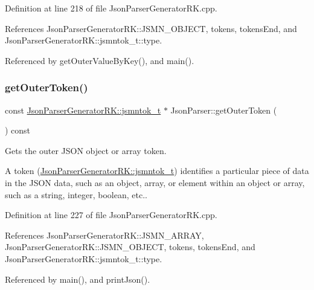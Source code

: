 Definition at line 218 of file Json\+Parser\+Generator\+R\+K.\+cpp.



References Json\+Parser\+Generator\+R\+K\+::\+J\+S\+M\+N\+\_\+\+O\+B\+J\+E\+CT, tokens, tokens\+End, and Json\+Parser\+Generator\+R\+K\+::jsmntok\+\_\+t\+::type.



Referenced by get\+Outer\+Value\+By\+Key(), and main().

\mbox{\label{class_json_parser_a3c28b01c0e1fc3c7677e07e1739ea288}} 
\subsubsection{\texorpdfstring{get\+Outer\+Token()}{getOuterToken()}}
{\footnotesize\ttfamily const \hyperlink{struct_json_parser_generator_r_k_1_1jsmntok__t}{Json\+Parser\+Generator\+R\+K\+::jsmntok\+\_\+t} $\ast$ Json\+Parser\+::get\+Outer\+Token (\begin{DoxyParamCaption}{ }\end{DoxyParamCaption}) const}



Gets the outer J\+S\+ON object or array token. 

A token (\hyperlink{struct_json_parser_generator_r_k_1_1jsmntok__t}{Json\+Parser\+Generator\+R\+K\+::jsmntok\+\_\+t}) identifies a particular piece of data in the J\+S\+ON data, such as an object, array, or element within an object or array, such as a string, integer, boolean, etc.. 

Definition at line 227 of file Json\+Parser\+Generator\+R\+K.\+cpp.



References Json\+Parser\+Generator\+R\+K\+::\+J\+S\+M\+N\+\_\+\+A\+R\+R\+AY, Json\+Parser\+Generator\+R\+K\+::\+J\+S\+M\+N\+\_\+\+O\+B\+J\+E\+CT, tokens, tokens\+End, and Json\+Parser\+Generator\+R\+K\+::jsmntok\+\_\+t\+::type.



Referenced by main(), and print\+Json().

\mbox{\label{class_json_parser_a38858994342cd2735b716b117bf8afdf}} 
